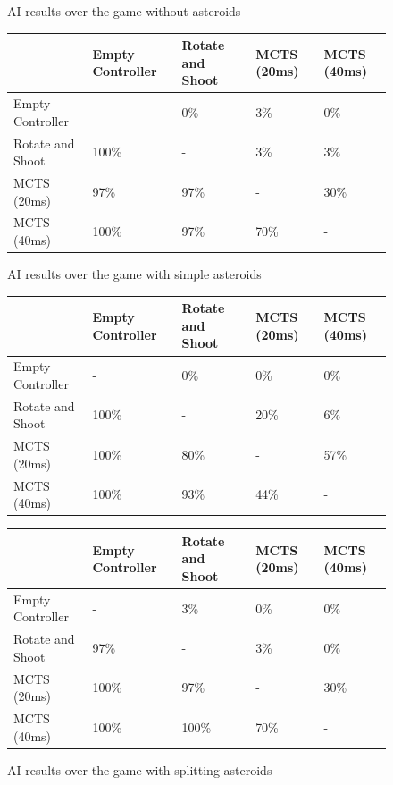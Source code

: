 \begin{figure}
	\caption{AI results over the game without asteroids}
	\begin{tabular}{x{7.1em} | x{4.2em} x{4.1em} x{3.1em} x{3.1em}}
		&
			Empty Controller &
			Rotate and Shoot &
			MCTS (20ms) &
			MCTS (40ms) \\ \hline
		Empty Controller &
			-&
			0\% &
			3\% &
			0\% \\
		Rotate and Shoot &
			100\% &
			-&
			3\% &
			3\% \\ 
		MCTS (20ms) &
			97\% &
			97\% &
			-&
			30\% \\
		MCTS (40ms) &
			100\% &
			97\% &
			70\% &
			-\\
	\end{tabular}
	\vspace{1em}
	\caption{AI results over the game with simple asteroids}
	\begin{tabular}{x{7.1em} | x{4.2em} x{4.1em} x{3.1em} x{3.1em}}
		&
			Empty Controller &
			Rotate and Shoot &
			MCTS (20ms) &
			MCTS (40ms) \\ \hline
		Empty Controller &
			-&
			0\% &
			0\% &
			0\% \\
		Rotate and Shoot &
			100\% &
			-&
			20\% &
			6\% \\ 
		MCTS (20ms) &
			100\% &
			80\% &
			-&
			57\% \\
		MCTS (40ms) &
			100\% &
			93\% &
			44\% &
			-\\
	\end{tabular}
	\vspace{1em}
	\caption{AI results over the game with splitting asteroids}
	\begin{tabular}{x{7.1em} | x{4.2em} x{4.1em} x{3.1em} x{3.1em}}
		&
			Empty Controller &
			Rotate and Shoot &
			MCTS (20ms) &
			MCTS (40ms) \\ \hline
		Empty Controller &
			-&
			3\% &
			0\% &	
			0\% \\
		Rotate and Shoot &
			97\% &
			-&
			3\% &
			0\% \\ 
		MCTS (20ms) &
			100\% &
			97\% &
			-&
			30\% \\
		MCTS (40ms) &
			100\% &
			100\% &
			70\% &
			-\\
	\end{tabular}
\end{figure}

